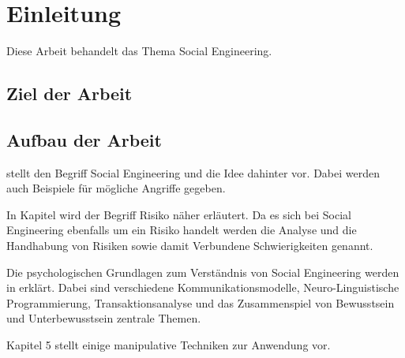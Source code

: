 \section{Einleitung}\label{sec:2_einleitung}
Diese Arbeit behandelt das Thema Social Engineering.

\subsection{Ziel der Arbeit}\label{sec:ziel_der_arbeit}


\subsection{Aufbau der Arbeit}\label{sec:aufbau_der_arbeit}
 stellt den Begriff Social Engineering und die Idee dahinter vor.
Dabei werden auch Beispiele für mögliche Angriffe gegeben.

In Kapitel  wird der Begriff Risiko näher erläutert.
Da es sich bei Social Engineering ebenfalls um ein Risiko handelt werden die Analyse und die Handhabung
von Risiken sowie damit Verbundene Schwierigkeiten genannt.

Die psychologischen Grundlagen zum Verständnis von Social Engineering werden in
 erklärt.
Dabei sind verschiedene Kommunikationsmodelle, Neuro-Linguistische Programmierung, Transaktionsanalyse
und das Zusammenspiel von Bewusstsein und Unterbewusstsein zentrale Themen.

Kapitel 5 stellt einige manipulative Techniken zur Anwendung vor.